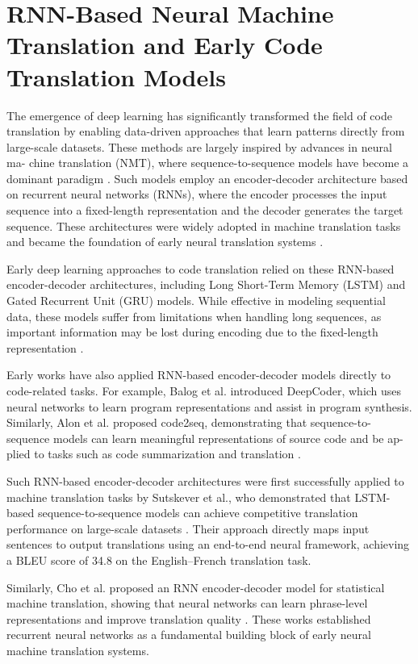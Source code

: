 \section{RNN-Based Neural Machine Translation and Early Code Translation Models}

The emergence of deep learning has significantly transformed the field of code
translation by enabling data-driven approaches that learn patterns directly from
large-scale datasets. These methods are largely inspired by advances in neural ma-
chine translation (NMT), where sequence-to-sequence
models have become a dominant paradigm \cite{sutskever2014, cho2014}. Such
models employ an encoder-decoder architecture based on recurrent neural networks
(RNNs), where the encoder processes the input sequence into a fixed-length
representation and the decoder generates the target sequence. These
architectures were widely adopted in machine translation tasks and became the
foundation of early neural translation systems \cite{bahdanau2015}.

Early deep learning approaches to code translation relied on these RNN-based
encoder-decoder architectures, including Long Short-Term Memory (LSTM) and Gated
Recurrent Unit (GRU) models. While effective in modeling sequential data, these
models suffer from limitations when handling long sequences, as important
information may be lost during encoding due to the fixed-length representation
\cite{bahdanau2015}.

Early works have also applied RNN-based encoder-decoder models directly to
code-related tasks. For example, Balog et al. introduced DeepCoder, which uses
neural networks to learn program representations and assist in program synthesis. Similarly, Alon et al. proposed code2seq, demonstrating that
sequence-to-sequence models can learn meaningful representations of source code
and be ap- plied to tasks such as code summarization and translation
\cite{deepcoder, code2seq}.

Such RNN-based encoder-decoder architectures were first successfully applied to
machine translation tasks by Sutskever et al., who demonstrated that LSTM-based
sequence-to-sequence models can achieve competitive translation performance on
large-scale datasets \cite{sutskever2014}. Their approach directly maps input
sentences to output translations using an end-to-end neural framework, achieving
a BLEU score of 34.8 on the English–French translation task.

Similarly, Cho et al. proposed an RNN encoder-decoder model for statistical
machine translation, showing that neural networks can learn phrase-level
representations and improve translation quality \cite{cho2014}. These works
established recurrent neural networks as a fundamental building block of early
neural machine translation systems.


